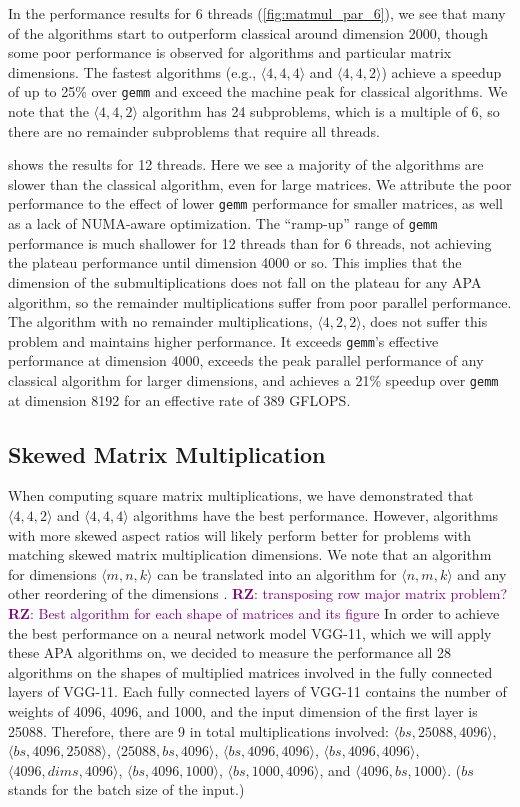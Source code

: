 \documentclass[sigconf,review,anonymous]{acmart}
\newcommand{\dims}[1]{\langle #1 \rangle}
\newcommand{\RZ}[1]{\textcolor{purple}{\textbf{RZ}: #1}}
\begin{document}
In the performance results for 6 threads (\cref{fig:matmul_par_6}), we see that many of the algorithms start to outperform classical around dimension 2000, though some poor performance is observed for algorithms and particular matrix dimensions.
The fastest algorithms (e.g., $\dims{4,4,4}$ and $\dims{4,4,2}$) achieve a speedup of up to 25\% over \texttt{gemm} and exceed the machine peak for classical algorithms.
We note that the $\dims{4,4,2}$ algorithm has 24 subproblems, which is a multiple of 6, so there are no remainder subproblems that require all threads.

 shows the results for 12 threads.
Here we see a majority of the algorithms are slower than the classical algorithm, even for large matrices.
We attribute the poor performance to the effect of lower \texttt{gemm} performance for smaller matrices, as well as a lack of NUMA-aware optimization.
The ``ramp-up'' range of \texttt{gemm} performance is much shallower for 12 threads than for 6 threads, not achieving the plateau performance until dimension 4000 or so.
This implies that the dimension of the submultiplications does not fall on the plateau for any APA algorithm, so the remainder multiplications suffer from poor parallel performance.
The algorithm with no remainder multiplications, $\dims{4,2,2}$, does not suffer this problem and maintains higher performance.
It exceeds \texttt{gemm}'s effective performance at dimension 4000, exceeds the peak parallel performance of any classical algorithm for larger dimensions, and achieves a 21\% speedup over \texttt{gemm} at dimension 8192 for an effective rate of 389 GFLOPS.

\subsection{Skewed Matrix Multiplication}
When computing square matrix multiplications, we have demonstrated that $\dims{4,4,2}$ and $\dims{4,4,4}$ algorithms have the best performance.
However, algorithms with more skewed aspect ratios will likely perform better for problems with matching skewed matrix multiplication dimensions.
We note that an algorithm for dimensions $\dims{m,n,k}$ can be translated into an algorithm for $\dims{n,m,k}$ and any other reordering of the dimensions \cite{BB15}.
\RZ{transposing row major matrix problem?}
\RZ{Best algorithm for each shape of matrices and its figure}
In order to achieve the best performance on a neural network model VGG-11, which we will apply these APA algorithms on, we decided to measure the performance all 28 algorithms on the shapes of multiplied matrices involved in the fully connected layers of VGG-11.
Each fully connected layers of VGG-11 contains the number of weights of 4096, 4096, and 1000, and the input dimension of the first layer is 25088.
Therefore, there are 9 in total multiplications involved: $\dims{bs, 25088, 4096}$, $\dims{bs, 4096, 25088}$, $\dims{25088, bs, 4096}$, $\dims{bs, 4096, 4096}$, $\dims{bs, 4096, 4096}$, $\dims{4096, dims, 4096}$, $\dims{bs, 4096, 1000}$, $\dims{bs, 1000, 4096}$, and $\dims{4096, bs, 1000}$.
($bs$ stands for the batch size of the input.)
\end{document}
